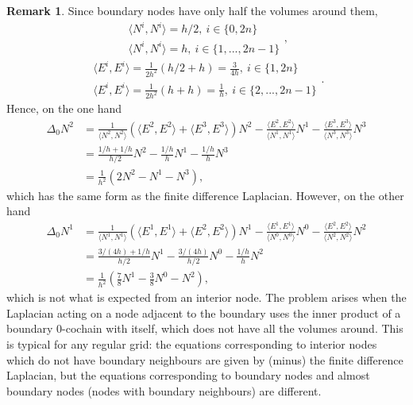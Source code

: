 \documentclass{elsarticle}
\theoremstyle{definition}
\newtheorem{remark}[theorem]{Remark}
\newcommand{\inner}[2]{\langle#1,#2\rangle}
\begin{document}
\begin{remark}
  Since boundary nodes have only half the volumes around them,
  \begin{equation*}
    \begin{split}
      \inner{N^i}{N^i} = h / 2,\ i \in \{0, 2n \} \\
      \inner{N^i}{N^i} = h,\ i \in \{1, ..., 2n - 1 \}
    \end{split},
  \end{equation*}
  \begin{equation*}
    \begin{split}
      \inner{E^i}{E^i} = \frac{1}{2 h^2}(h / 2 + h) = \frac{3}{4h},\ i \in \{1, 2n\} \\
      \inner{E^i}{E^i} = \frac{1}{2 h^2}(h + h) = \frac{1}{h},\ i \in \{2, ..., 2n - 1\}
    \end{split}.
  \end{equation*}
  Hence, on the one hand
  \begin{equation*}
    \begin{split}
      \Delta_0 N^2 
        & = \frac{1}{\inner{N^2}{N^2}} (\inner{E^2}{E^2} + \inner{E^3}{E^3}) N^2 
          - \frac{\inner{E^2}{E^2}}{\inner{N^1}{N^1}} N^1
          - \frac{\inner{E^3}{E^3}}{\inner{N^3}{N^3}} N^3 \\
        & = \frac{1 / h + 1 / h}{h / 2}  N^2 - \frac{1 / h}{h} N^1 - \frac{1 / h}{h} N^3 \\
        & = \frac{1}{h^2} \left(2 N^2 - N^1 - N^3 \right),
    \end{split}
  \end{equation*}
  which has the same form as the finite difference Laplacian. However, on the other hand
  \begin{equation*}
    \begin{split}
      \Delta_0 N^1 
        & = \frac{1}{\inner{N^1}{N^1}} (\inner{E^1}{E^1} + \inner{E^2}{E^2}) N^1 
          - \frac{\inner{E^1}{E^1}}{\inner{N^0}{N^0}} N^0
          - \frac{\inner{E^2}{E^2}}{\inner{N^2}{N^2}} N^2 \\
        & = \frac{3 / (4 h) + 1 / h}{h / 2}  N^1 - \frac{3 / (4 h)}{h / 2} N^0 - \frac{1 / h}{h} N^2 \\
        & = \frac{1}{h^2} \left( \frac{7}{8} N^1 - \frac{3}{8} N^0 - N^2 \right),
    \end{split}
  \end{equation*}
  which is not what is expected from an interior node. The problem arises when the Laplacian acting on a node adjacent to the boundary uses the inner product of a boundary $0$-cochain with itself, which does not have all the volumes around. This is typical for any regular grid: the equations corresponding to interior nodes which do not have boundary neighbours are given by (minus) the finite difference Laplacian, but the equations corresponding to boundary nodes and almost boundary nodes (nodes with boundary neighbours) are different.
  

\end{remark}
\end{document}
